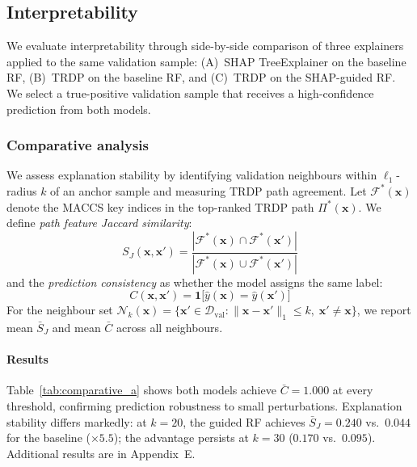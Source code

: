 \documentclass[letterpaper]{article} %
\begin{document}
\subsection{Interpretability}
We evaluate interpretability through side-by-side comparison of three explainers applied to the same validation sample: (A)~SHAP TreeExplainer on the baseline RF, (B)~TRDP on the baseline RF, and (C)~TRDP on the SHAP-guided RF.  We select a true-positive validation sample that receives a high-confidence prediction from both models.

\subsubsection{Comparative analysis}
We assess explanation stability by identifying validation neighbours within $\ell_1$-radius $k$ of an anchor sample and measuring TRDP path agreement. Let $\mathcal{F}^*(\mathbf{x})$ denote the MACCS key indices in the top-ranked TRDP path $\Pi^*(\mathbf{x})$. We define \emph{path feature Jaccard similarity}:
\begin{equation}
    S_J(\mathbf{x}, \mathbf{x}') = \frac{|\mathcal{F}^*(\mathbf{x}) \cap \mathcal{F}^*(\mathbf{x}')|}{|\mathcal{F}^*(\mathbf{x}) \cup \mathcal{F}^*(\mathbf{x}')|}
    \label{eq:jaccard}
\end{equation}
and the \emph{prediction consistency} as whether the model assigns the same label:
\begin{equation}
    C(\mathbf{x}, \mathbf{x}') = \mathbf{1}\bigl[\hat{y}(\mathbf{x}) = \hat{y}(\mathbf{x}')\bigr]
    \label{eq:pred_consist}
\end{equation}
For the neighbour set $\mathcal{N}_k(\mathbf{x}) = \{\mathbf{x}' \in \mathcal{D}_{\text{val}} : \|\mathbf{x} - \mathbf{x}'\|_1 \leq k,\; \mathbf{x}' \neq \mathbf{x}\}$, we report mean $\bar{S}_J$ and mean $\bar{C}$ across all neighbours.

\paragraph{Results}
Table~\ref{tab:comparative_a} shows both models achieve $\bar{C}=1.000$ at every threshold, confirming prediction robustness to small perturbations. Explanation stability differs markedly: at $k=20$, the guided RF achieves $\bar{S}_J=0.240$ vs.\ $0.044$ for the baseline (${\times}5.5$); the advantage persists at $k=30$ ($0.170$ vs.\ $0.095$). Additional results are in Appendix~E.
\end{document}
